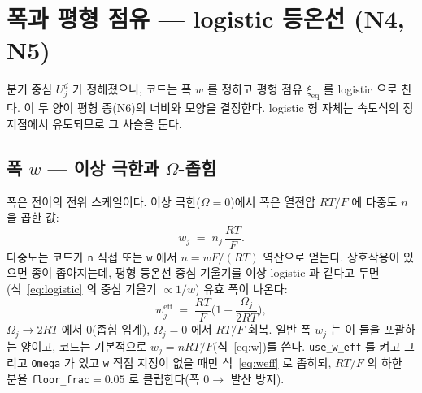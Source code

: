 \documentclass[11pt,a4paper]{article}
\newcommand{\eff}{\mathrm{eff}}
\newcommand{\eq}{\mathrm{eq}}
\begin{document}
\section{폭과 평형 점유 — logistic 등온선 (N4, N5)}\label{sec:width}
분기 중심 $U_j^d$ 가 정해졌으니, 코드는 폭 $w$ 를 정하고 평형 점유 $\xi_\eq$ 를 logistic 으로 친다. 이 두 양이 평형 종(N6)의 너비와 모양을 결정한다. logistic 형 자체는 속도식의 정지점에서 유도되므로 그 사슬을 둔다.

\subsection{폭 $w$ — 이상 극한과 $\Omega$-좁힘}
폭은 전이의 전위 스케일이다. 이상 극한($\Omega=0$)에서 폭은 열전압 $RT/F$ 에 다중도 $n$ 을 곱한 값:
\begin{equation}
w_j\;=\;n_j\,\frac{RT}{F}.
\label{eq:w}
\end{equation}
다중도는 코드가 \texttt{n} 직접 또는 \texttt{w} 에서 $n=wF/(RT)$ 역산으로 얻는다. 상호작용이 있으면 종이 좁아지는데, 평형 등온선 중심 기울기를 이상 logistic 과 같다고 두면(식~\eqref{eq:logistic} 의 중심 기울기 $\propto1/w$) 유효 폭이 나온다:
\begin{equation}
w_j^\eff\;=\;\frac{RT}{F}\Big(1-\frac{\Omega_j}{2RT}\Big),
\label{eq:weff}
\end{equation}
$\Omega_j\to2RT$ 에서 $0$(좁힘 임계), $\Omega_j=0$ 에서 $RT/F$ 회복. 일반 폭 $w_j$ 는 이 둘을 포괄하는 양이고, 코드는 기본적으로 $w_j=nRT/F$(식~\eqref{eq:w})를 쓴다. \texttt{use\_w\_eff} 를 켜고 그리고 \texttt{Omega} 가 있고 \texttt{w} 직접 지정이 없을 때만 식~\eqref{eq:weff} 로 좁히되, $RT/F$ 의 하한 분율 \texttt{floor\_frac}$=0.05$ 로 클립한다(폭 $0\to$ 발산 방지).
\end{document}
